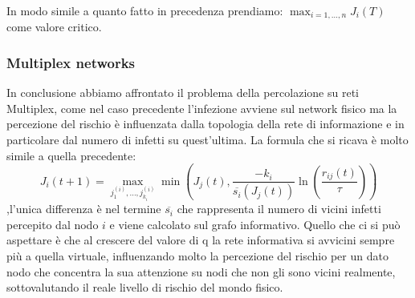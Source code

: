 In modo simile a quanto fatto in precedenza prendiamo: $\max_{i= 1,\dots,n}J_{i}(T)$ come valore critico.

\subsubsection{Multiplex networks}\label{subsubsec:multiplex-networks}
In conclusione abbiamo affrontato il problema della percolazione su reti Multiplex, come nel caso precedente 
l'infezione avviene sul network fisico ma la
percezione del rischio è influenzata dalla topologia della rete di informazione e in particolare dal numero di
infetti su quest'ultima.
La formula che si ricava è molto simile a quella precedente:
\begin{equation}
    J_{i}(t+1)=\max_{j^{(i)}_{1},\dots,j^{(i)}_{k_{i}}}\min(J_{j}(t),\frac{-k_{ i}}{\overline{s_{i}}(J_{j}(t))}\ln(\frac{r_{ij}(t)}{\tau}))\label{eq:multiplex}
\end{equation}
,l'unica differenza è nel termine $\overline{s_{i}}$ che rappresenta il numero di vicini infetti percepito
dal nodo $i$ e viene calcolato sul grafo informativo.
Quello che ci si può aspettare è che al crescere del valore di q la rete informativa si avvicini sempre più a quella
virtuale, influenzando molto la percezione del rischio per un dato nodo che concentra la sua attenzione su nodi che non
gli sono vicini realmente, sottovalutando il reale livello di rischio del mondo fisico.
